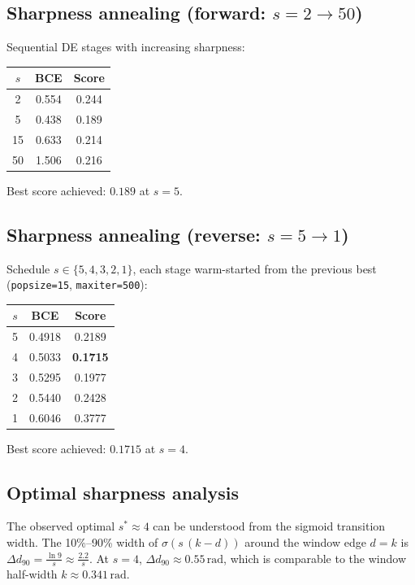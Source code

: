 \documentclass[11pt,a4paper]{article}
\begin{document}
\subsection{Sharpness annealing (forward: $s=2\to50$)}
Sequential DE stages with increasing sharpness:
\begin{center}
\begin{tabular}{ccc}
\hline
$s$ & BCE & Score \\ \hline
2  & 0.554 & 0.244 \\
5  & 0.438 & 0.189 \\
15 & 0.633 & 0.214 \\
50 & 1.506 & 0.216 \\ \hline
\end{tabular}
\end{center}
Best score achieved: $\mathbf{0.189}$ at $s=5$.

\subsection{Sharpness annealing (reverse: $s=5\to1$)}
Schedule $s\in\{5,4,3,2,1\}$, each stage warm-started from the previous
best (\texttt{popsize=15}, \texttt{maxiter=500}):
\begin{center}
\begin{tabular}{ccc}
\hline
$s$ & BCE & Score \\ \hline
5 & 0.4918 & 0.2189 \\
4 & 0.5033 & \textbf{0.1715} \\
3 & 0.5295 & 0.1977 \\
2 & 0.5440 & 0.2428 \\
1 & 0.6046 & 0.3777 \\ \hline
\end{tabular}
\end{center}
Best score achieved: $\mathbf{0.1715}$ at $s=4$.

\subsection{Optimal sharpness analysis}

The observed optimal $s^*\approx 4$ can be understood from the sigmoid
transition width.  The 10\%--90\% width of $\sigma(s\,(k-d))$ around the
window edge $d=k$ is $\Delta d_{90} = \frac{\ln 9}{s} \approx \frac{2.2}{s}$.
At $s=4$, $\Delta d_{90}\approx 0.55\,\text{rad}$, which is comparable to the
window half-width $k\approx 0.341\,\text{rad}$.
\end{document}
